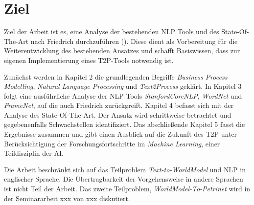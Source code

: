 \section{Ziel}

Ziel der Arbeit ist es, eine Analyse der bestehenden \ac{NLP} Tools und des State-Of-The-Art nach Friedrich durchzuführen (\cite[vgl.][]{FRIEDRICH1}). Diese dient als Vorbereitung für die Weiterentwicklung des bestehenden Ansatzes und schafft Basiswissen, dass zur eigenen Implementierung eines \ac{T2P}-Tools notwendig ist.

Zunächst werden in Kapitel 2 die grundlegenden Begriffe \textit{Business Process Modelling}, \textit{Natural Language Processing} und \textit{Text2Process} geklärt. In Kapitel 3 folgt eine ausführliche Analyse der \ac{NLP} Tools \textit{StanfordCoreNLP}, \textit{WordNet} und \textit{FrameNet}, auf die auch Friedrich zurückgreift. Kapitel 4 befasst sich mit der Analyse des State-Of-The-Art. Der Ansatz wird schrittweise betrachtet und gegebenenfalls Schwachstellen identifiziert. Das abschließende Kapitel 5 fasst die Ergebnisse zusammen und gibt einen Ausblick auf die Zukunft des \ac{T2P} unter Berücksichtigung der Forschungsfortschritte im \textit{Machine Learning}, einer Teildisziplin der \ac{AI}.

Die Arbeit beschränkt sich auf das Teilproblem \textit{Text-to-WorldModel} und \ac{NLP} in englischer Sprache. Die Übertragbarkeit der Vorgehensweise in andere Sprachen ist nicht Teil der Arbeit. Das zweite Teilproblem, \textit{WorldModel-To-Petrinet} wird in der Seminararbeit xxx von xxx diskutiert.
